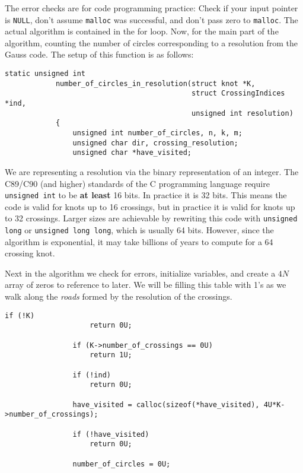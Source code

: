 \documentclass{article}
\theoremstyle{plain}
\begin{document}
        The error checks are for code programming practice: Check if your
        input pointer is \texttt{NULL}, don't assume \texttt{malloc} was
        successful, and don't pass zero to \texttt{malloc}. The actual algorithm
        is contained in the for loop.
        \newpage
        Now, for the main part of the algorithm, counting the number of circles
        corresponding to a resolution from the Gauss code.
        The setup of this function is as follows:
        \begin{lstlisting}[style=CStyle, gobble=12]
        static unsigned int
            number_of_circles_in_resolution(struct knot *K,
                                            struct CrossingIndices *ind,
                                            unsigned int resolution)
            {
                unsigned int number_of_circles, n, k, m;
                unsigned char dir, crossing_resolution;
                unsigned char *have_visited;
        \end{lstlisting}
        We are representing a resolution via the binary representation of an
        integer. The C89/C90 (and higher) standards of the C programming
        language require \texttt{unsigned int} to be \textbf{at least} 16 bits.
        In practice it is 32 bits. This means the code is valid for knots up
        to 16 crossings, but in practice it is valid for knots up to 32
        crossings. Larger sizes are achievable by rewriting this code with
        \texttt{unsigned long} or \texttt{unsigned long long}, which is usually
        64 bits. However, since the algorithm is exponential, it may take
        billions of years to compute for a 64 crossing knot.
        \par\hfill\par
        Next in the algorithm we check for errors, initialize variables, and
        create a $4N$ array of zeros to reference to later. We will be filling
        this table with 1's as we walk along the \textit{roads} formed by the
        resolution of the crossings.
        \begin{lstlisting}[style=CStyle, gobble=12]
                if (!K)
                    return 0U;

                if (K->number_of_crossings == 0U)
                    return 1U;

                if (!ind)
                    return 0U;

                have_visited = calloc(sizeof(*have_visited), 4U*K->number_of_crossings);

                if (!have_visited)
                    return 0U;

                number_of_circles = 0U;
        \end{lstlisting}
\end{document}
